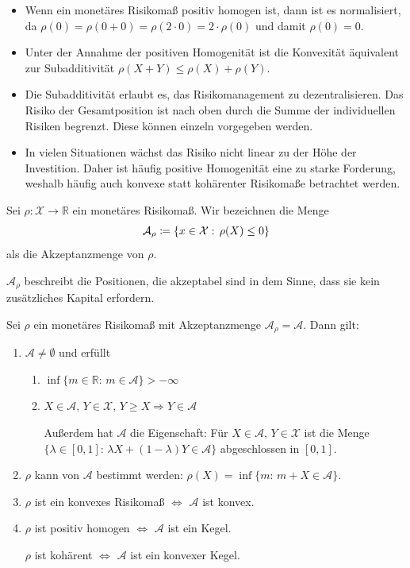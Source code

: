 \documentclass[a4paper,twoside,DIV15,BCOR12mm]{scrbook}
\begin{document}
\begin{bemerkung}
\begin{itemize}
\item Wenn ein monetäres Risikomaß positiv homogen ist, dann ist es normalisiert, da $\rho(0)=\rho(0+0)=\rho(2\cdot 0)=2\cdot \rho(0)$ und damit $\rho(0)=0$.
\item Unter der Annahme der positiven Homogenität ist die Konvexität äquivalent zur Subadditivität $\rho(X+Y)\leq \rho(X)+\rho (Y)$.
\item Die Subadditivität erlaubt es, das Risikomanagement zu dezentralisieren. Das Risiko der Gesamtposition ist nach oben durch die Summe der individuellen Risiken begrenzt. Diese können einzeln vorgegeben werden.
\item In vielen Situationen wächst das Risiko nicht linear zu der Höhe der Investition. Daher ist häufig positive Homogenität eine zu starke Forderung, weshalb häufig auch konvexe statt kohärenter Risikomaße betrachtet werden.
\end{itemize}
\end{bemerkung}

\begin{definition}
Sei $\rho:\mathcal{X}\to\mathbb{R}$ ein monetäres Risikomaß. Wir bezeichnen die Menge
\[
\mathcal{A}_\rho\da\{x\in \mathcal{X}:\, \rho(X)\leq 0\}
\]
als die Akzeptanzmenge von $\rho$.

$\mathcal{A}_\rho$ beschreibt die Positionen, die akzeptabel sind in dem Sinne, dass sie kein zusätzliches Kapital erfordern.
\end{definition}

\begin{satz}
Sei $\rho$ ein monetäres Risikomaß mit Akzeptanzmenge $\mathcal{A}_\rho=\mathcal{A}$. Dann gilt:
\begin{enumerate}
\item $\mathcal{A}\neq\emptyset$ und erfüllt

\begin{enumerate}
\item $\inf\{m\in\mathbb{R}:\, m\in\mathcal{A}\}>-\infty$
\item $X\in\mathcal{A},\, Y\in\mathcal{X}, \, Y\geq X \Rightarrow Y\in\mathcal{A}$

Außerdem hat $\mathcal{A}$ die Eigenschaft: Für $X\in\mathcal{A},\, Y\in\mathcal{X}$ ist die Menge $\{\lambda\in[0, 1]:\, \lambda X+(1-\lambda) Y\in\mathcal{A}\}$ abgeschlossen in $[0, 1]$.
\end{enumerate}

\item $\rho$ kann von $\mathcal{A}$ bestimmt werden: $\rho(X)=\inf\{m:\, m+X\in\mathcal{A}\}$.
\item $\rho$ ist ein konvexes Risikomaß $\Leftrightarrow$ $\mathcal{A}$ ist konvex.
\item $\rho$ ist positiv homogen $\Leftrightarrow$ $\mathcal{A}$ ist ein Kegel.

$\rho$ ist kohärent $\Leftrightarrow$ $\mathcal{A}$ ist ein konvexer Kegel.
\end{enumerate}
\end{satz}
\end{document}
